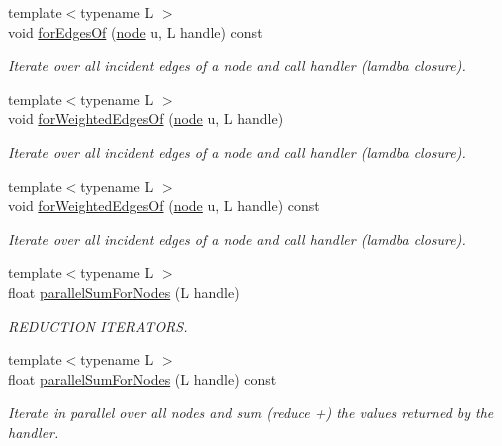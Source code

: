 \begin{DoxyCompactItemize}
{\footnotesize template$<$typename L $>$ }\\void \hyperlink{class_ensemble_clustering_1_1_graph_afd8be5c1575a9284f4724cd35f70786d}{for\-Edges\-Of} (\hyperlink{namespace_ensemble_clustering_ae829290aeccd1a420b17a37fd901f114}{node} u, L handle) const 
\begin{DoxyCompactList}\small\item\em Iterate over all incident edges of a node and call handler (lamdba closure). \end{DoxyCompactList}\item 
{\footnotesize template$<$typename L $>$ }\\void \hyperlink{class_ensemble_clustering_1_1_graph_a220066b601f83555e761f00c6a95685b}{for\-Weighted\-Edges\-Of} (\hyperlink{namespace_ensemble_clustering_ae829290aeccd1a420b17a37fd901f114}{node} u, L handle)
\begin{DoxyCompactList}\small\item\em Iterate over all incident edges of a node and call handler (lamdba closure). \end{DoxyCompactList}\item 
{\footnotesize template$<$typename L $>$ }\\void \hyperlink{class_ensemble_clustering_1_1_graph_aea6308444f5af64905abde8ab0f77ddd}{for\-Weighted\-Edges\-Of} (\hyperlink{namespace_ensemble_clustering_ae829290aeccd1a420b17a37fd901f114}{node} u, L handle) const 
\begin{DoxyCompactList}\small\item\em Iterate over all incident edges of a node and call handler (lamdba closure). \end{DoxyCompactList}\item 
{\footnotesize template$<$typename L $>$ }\\float \hyperlink{class_ensemble_clustering_1_1_graph_a1c393ae56317a49834f134bc725774dc}{parallel\-Sum\-For\-Nodes} (L handle)
\begin{DoxyCompactList}\small\item\em R\-E\-D\-U\-C\-T\-I\-O\-N I\-T\-E\-R\-A\-T\-O\-R\-S. \end{DoxyCompactList}\item 
{\footnotesize template$<$typename L $>$ }\\float \hyperlink{class_ensemble_clustering_1_1_graph_a6c2cc508ee55b53baaff7c5cf8ca1f62}{parallel\-Sum\-For\-Nodes} (L handle) const 
\begin{DoxyCompactList}\small\item\em Iterate in parallel over all nodes and sum (reduce +) the values returned by the handler. \end{DoxyCompactList}\item 

\end{DoxyCompactItemize}
